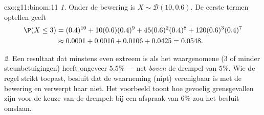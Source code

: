 \begin{solution}{exo:g11:binom:11}
\emph{1.} Onder de bewering is $X \sim \mathcal B(10, 0.6)$. De eerste termen
optellen geeft
\begin{align*}
\P(X \leq 3)
&= (0.4)^{10} + 10(0.6)(0.4)^9 + 45(0.6)^2(0.4)^8
+ 120(0.6)^3(0.4)^7\\
&\approx 0.0001 + 0.0016 + 0.0106 + 0.0425 = 0.0548 .
\end{align*}

\emph{2.} Een resultaat dat minstens even extreem is als het waargenomene
($3$ of minder steunbetuigingen) heeft  ongeveer $5.5\%$ --- net
\emph{boven} de drempel van $5\%$. Wie de regel strikt toepast, besluit dat
de waarneming (nipt) verenigbaar is met de bewering en verwerpt haar niet.
Het voorbeeld toont hoe gevoelig grensgevallen zijn voor de keuze van de
drempel: bij een afspraak van $6\%$ zou het besluit omslaan.
\end{solution}

